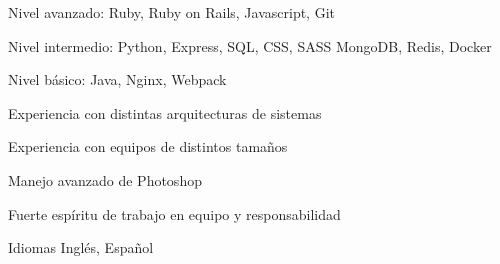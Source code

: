 \pagebreak
{}


\begin{cvskills}

  \cvskill
    {Nivel avanzado:}
    {Ruby, Ruby on Rails, Javascript, Git}

  \cvskill
    {Nivel intermedio:}
    {Python, Express, SQL, CSS, SASS}
  \cvskill
    {}
    {MongoDB, Redis, Docker}

  \cvskill
    {Nivel básico:}
    {Java, Nginx, Webpack}

  \cvskill
    {Experiencia con distintas arquitecturas de sistemas}
    {}

  \cvskill
    {Experiencia con equipos de distintos tamaños}
    {}

  \cvskill
    {Manejo avanzado de Photoshop}
    {}

  \cvskill
    {Fuerte espíritu de trabajo en equipo y responsabilidad}
    {}

  \cvskill
    {Idiomas}
    {Inglés, Español}

\end{cvskills}
